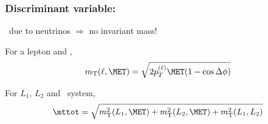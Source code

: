 \begin{frame}
\frametitle{Discriminant variable: \mttot}

\manip \MET\ due to neutrinos $\Rightarrow$ no invariant mass!

\vfill 

\begin{minipage}[c]{.6\textwidth}
\manip For a lepton and \MET,
\begin{equation*}
m_{\mathrm{T}}(\ell,\MET) = \sqrt{2p_T^{(\ell)} \MET (1-\cos\Delta\phi)}
\end{equation*}
\end{minipage}
\begin{minipage}[c]{.35\textwidth}
\begin{center}
\end{center}
\end{minipage}

\vfill \pause

\manip For $L_1$, $L_2$ and \MET\ system,
\begin{equation*}
\mttot = \sqrt{m_{\mathrm{T}}^2(L_1,\MET) + m_{\mathrm{T}}^2(L_2,\MET) + m_{\mathrm{T}}^2(L_1,L_2)}
\end{equation*}

\vfill 

\end{frame}